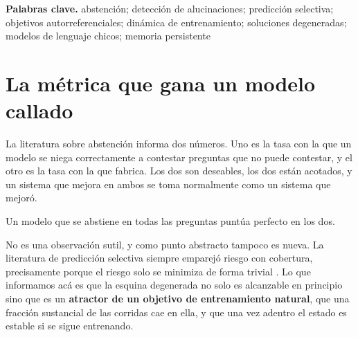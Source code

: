 \documentclass[11pt,a4paper]{article}
\begin{document}
\begin{abstract}
El punto degenerado es \textbf{absorbente} y no meramente lento. Medir la recuperación dentro de una
misma unidad con muestras pareadas a lo largo de $4000$ pasos más da $-0{,}0021$, o sea $0{,}4\sigma$,
y no se mueve. Informamos además una corrección a nuestra propia primera lectura, en la que una
tendencia entre unidades que sobrevive a un control de ruido ($r = 0{,}986$) igual no era
extrapolable, porque la curva es cóncava y un ajuste lineal escondía una saturación.

La consecuencia práctica es una afirmación sobre métricas y no sobre arquitectura. \textbf{Cualquier
criterio de éxito que lea tasa de abstención y tasa de fabricación sin leer exactitud global queda
maximizado por un modelo que no aprendió nada}, y un objetivo autorreferencial aporta una dinámica de
entrenamiento que alcanza ese máximo por sí sola, en una fracción sustancial de las corridas, sin
aviso de ninguna de las dos métricas.
\end{abstract}

\vspace{0.5em}
\noindent\textbf{Palabras clave.} abstención; detección de alucinaciones; predicción selectiva;
objetivos autorreferenciales; dinámica de entrenamiento; soluciones degeneradas; modelos de lenguaje
chicos; memoria persistente

\section{La métrica que gana un modelo callado}
\label{sec:intro}

La literatura sobre abstención informa dos números. Uno es la tasa con la que un modelo se niega
correctamente a contestar preguntas que no puede contestar, y el otro es la tasa con la que fabrica.
Los dos son deseables, los dos están acotados, y un sistema que mejora en ambos se toma normalmente
como un sistema que mejoró.

Un modelo que se abstiene en todas las preguntas puntúa perfecto en los dos.

No es una observación sutil, y como punto abstracto tampoco es nueva. La literatura de predicción
selectiva siempre emparejó riesgo con cobertura, precisamente porque el riesgo solo se minimiza de
forma trivial \citep{elyaniv2010selective, geifman2017selective}. Lo que informamos acá es que la
esquina degenerada no solo es alcanzable en principio sino que es un \textbf{atractor de un objetivo
de entrenamiento natural}, que una fracción sustancial de las corridas cae en ella, y que una vez
adentro el estado es estable si se sigue entrenando.
\end{document}
